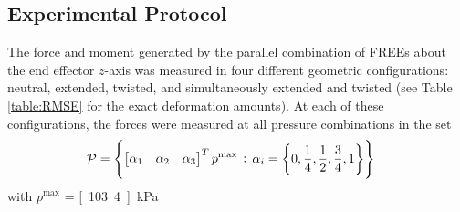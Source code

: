

\subsection{Experimental Protocol}
The force and moment generated by the parallel combination of FREEs about the end effector $z$-axis  was measured in four different geometric configurations: neutral, extended, twisted, and simultaneously extended and twisted (see Table \ref{table:RMSE} for the exact deformation amounts). 
At each of these configurations, the forces were measured at all pressure combinations in the set
\begin{align}
    \mathcal{P} &= \left\{ \begin{bmatrix} \alpha_1 & \alpha_2 & \alpha_3 \end{bmatrix}^T p^{\text{max}} \, : \, \alpha_i = \left\{ 0, \frac{1}{4}, \frac{1}{2}, \frac{3}{4}, 1 \right\} \right\}
\end{align}
with $p^{\text{max}}$ = \unit[103.4]{kPa}. 



